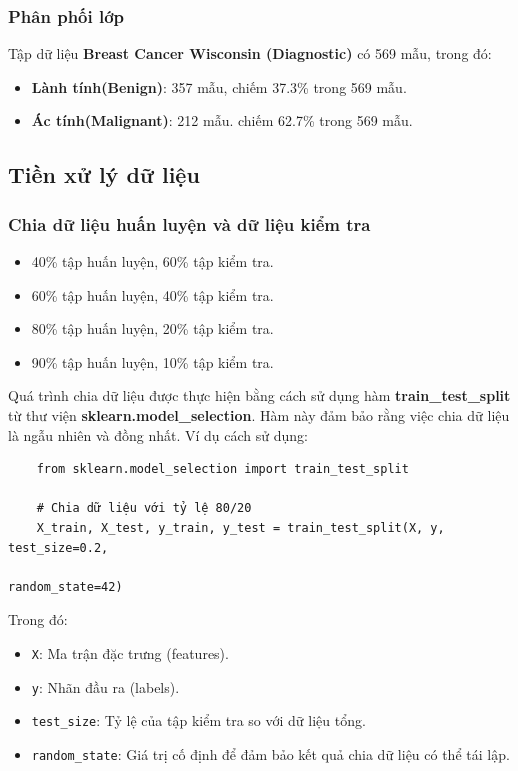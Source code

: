 \subsubsection{Phân phối lớp}

Tập dữ liệu \textbf{Breast Cancer Wisconsin (Diagnostic)} có 569 mẫu, trong đó:

\begin{itemize}
	\item \textbf{Lành tính(Benign)}: 357 mẫu, chiếm 37.3\% trong 569 mẫu. 
	\item \textbf{Ác tính(Malignant)}: 212 mẫu. chiếm 62.7\% trong 569 mẫu.
\end{itemize}


\subsection{Tiền xử lý dữ liệu}

\subsubsection{Chia dữ liệu huấn luyện và dữ liệu kiểm tra}

\begin{itemize}
	\item 40\% tập huấn luyện, 60\% tập kiểm tra.
	\item 60\% tập huấn luyện, 40\% tập kiểm tra.
	\item 80\% tập huấn luyện, 20\% tập kiểm tra.
	\item 90\% tập huấn luyện, 10\% tập kiểm tra.
\end{itemize}

Quá trình chia dữ liệu được thực hiện bằng cách sử dụng hàm \textbf{train\_test\_split} từ thư viện \textbf{sklearn.model\_selection}. Hàm này đảm bảo rằng việc chia dữ liệu là ngẫu nhiên và đồng nhất. Ví dụ cách sử dụng:

\begin{verbatim}
	from sklearn.model_selection import train_test_split
	
	# Chia dữ liệu với tỷ lệ 80/20
	X_train, X_test, y_train, y_test = train_test_split(X, y, test_size=0.2, 
																																																											random_state=42)
\end{verbatim}

Trong đó:
\begin{itemize}
	\item \texttt{X}: Ma trận đặc trưng (features).
	\item \texttt{y}: Nhãn đầu ra (labels).
	\item \texttt{test\_size}: Tỷ lệ của tập kiểm tra so với dữ liệu tổng.
	\item \texttt{random\_state}: Giá trị cố định để đảm bảo kết quả chia dữ liệu có thể tái lập.
\end{itemize}

